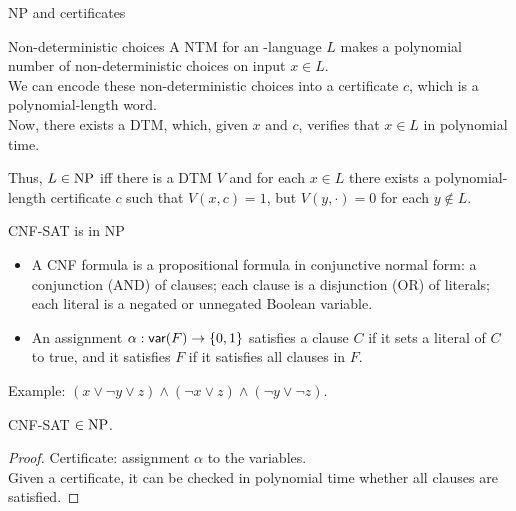 \begin{frame}{NP and certificates}

	\begin{block}{Non-deterministic choices}
		A NTM for an \NP-language $L$ makes a polynomial number of non-deterministic choices on input $x\in L$.\\
		We can encode these non-deterministic choices into a  \alert{certificate} $c$, which is a polynomial-length word.\\
		Now, there exists a DTM, which, given $x$ and $c$, verifies that $x\in L$ in polynomial time.
	\end{block}

	Thus, $L\in \text{\normalfont {NP}}$ iff there is a DTM $V$ and for each $x\in L$ there exists a polynomial-length certificate $c$ such that $V(x,c)=1$, but $V(y,\cdot)=0$ for each $y\notin L$.
\end{frame}


\begin{frame}{CNF-SAT is in NP}

	\begin{itemize}
		\item A \alert{CNF formula} is a propositional formula in conjunctive normal form: a conjunction (AND) of clauses; each clause is a disjunction (OR) of literals; each literal is a negated or unnegated Boolean variable.
		\item An assignment $\alpha: \text{\normalfont\sffamily var}(F) \rightarrow \{0,1\}$ satisfies a clause $C$ if it sets a literal of $C$ to true, and it satisfies $F$ if it satisfies all clauses in $F$.
	\end{itemize}


	Example: $(x \vee \neg y \vee z) \wedge (\neg x \vee z) \wedge (\neg y \vee \neg z)$.

	\begin{lemma}
		CNF-SAT $\in \text{\normalfont {NP}}$.
	\end{lemma}
	\pause
	\begin{proof}
		Certificate: assignment $\alpha$ to the variables.\\
		Given a certificate, it can be checked in polynomial time whether all clauses are satisfied.
	\end{proof}

\end{frame}

